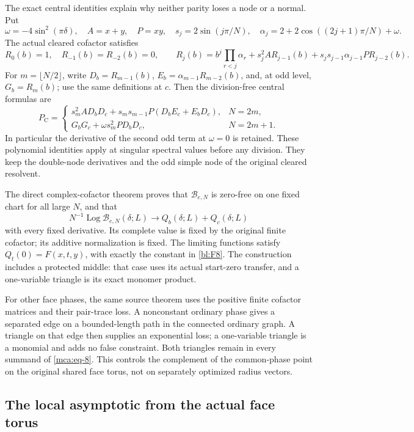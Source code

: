 The exact central identities explain why neither parity loses a node
or a normal. Put
\[
 \omega=-4\sin^2(\pi\delta),\quad A=x+y,\quad P=xy,\quad
 s_j=2\sin(j\pi/N),\quad
 \alpha_j=2+2\cos((2j+1)\pi/N)+\omega.
\]
The actual cleared cofactor satisfies
\[
 R_0(b)=1,\quad R_{-1}(b)=R_{-2}(b)=0,\qquad
 R_j(b)=b^j\prod_{r<j}\alpha_r+s_j^2A R_{j-1}(b)
           +s_js_{j-1}\alpha_{j-1}P R_{j-2}(b).
\]
For \(m=\lfloor N/2\rfloor\), write
\(D_b=R_{m-1}(b)\), \(E_b=\alpha_{m-1}R_{m-2}(b)\), and,
at odd level, \(G_b=R_m(b)\); use the same definitions at \(c\).
Then the division-free central formulas are
\begin{equation}\label{mca:eq-8}
 P_{\mathrm C}=
 \begin{cases}
 s_m^2A D_bD_c+s_ms_{m-1}P(D_bE_c+E_bD_c),&N=2m,\\
 G_bG_c+\omega s_m^2P D_bD_c,&N=2m+1.
 \end{cases}
\end{equation}
In particular the derivative of the second odd term at \(\omega=0\)
is retained. These polynomial identities apply at singular spectral
values before any division. They keep the double-node derivatives and
the odd simple node of the original cleared resolvent.

The direct complex-cofactor theorem proves that \(\mathcal B_{e,N}\)
is zero-free on one fixed chart for all large \(N\), and that
\[
 N^{-1}\operatorname{Log}\mathcal B_{e,N}(\delta;L)
       \longrightarrow Q_b(\delta;L)+Q_c(\delta;L)
\]
with every fixed derivative. Its complete value is fixed by the
original finite cofactor; its additive normalization is fixed. The limiting functions
satisfy \(Q_t(0)=F(x,t,y)\), with exactly the constant in
\eqref{bl:F8}. The construction includes a protected middle: that
case uses its actual start-zero transfer, and a one-variable triangle
is its exact monomer product.

For other face phases, the same source theorem uses the positive
finite cofactor matrices and their pair-trace loss. A nonconstant
ordinary phase gives a separated edge on a bounded-length path in the
connected ordinary graph. A triangle on that edge then supplies an
exponential loss; a one-variable triangle is a monomial and adds no
false constraint. Both triangles remain in every summand of
\eqref{mca:eq-8}. This controls the complement of the common-phase
point on the original shared face torus, not on separately optimized
radius vectors.

\subsection{The local asymptotic from the actual face
torus}\label{mca:sec-4}

